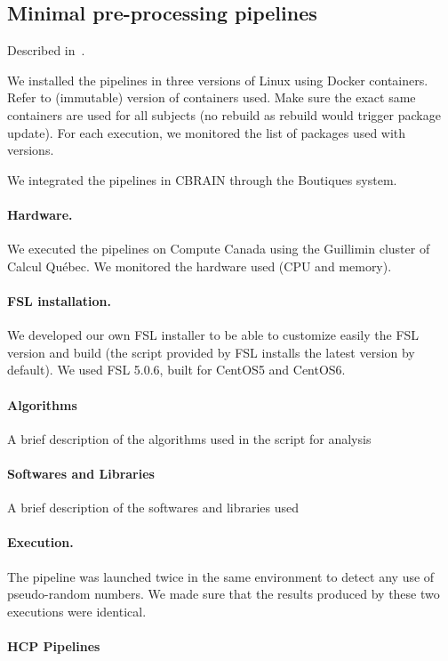 \documentclass{article}
\begin{document}
\subsection{Minimal pre-processing pipelines}

Described in~\cite{glasser2013minimal}.

We installed the pipelines in three versions of Linux using Docker
containers. Refer to (immutable) version of containers used. Make sure
the exact same containers are used for all subjects (no rebuild as
rebuild would trigger package update). For each execution, we
monitored the list of packages used with versions.

We integrated the pipelines in CBRAIN through the Boutiques system.

\paragraph{Hardware.} We executed the pipelines on Compute Canada
using the Guillimin cluster of Calcul Qu\'ebec. We monitored the
hardware used (CPU and memory). 

\paragraph{FSL installation.} We developed our own FSL installer to be
able to customize easily the FSL version and build (the script
provided by FSL installs the latest version by default). We used FSL
5.0.6, built for CentOS5 and CentOS6.

\paragraph{Algorithms}
A brief description of the algorithms used in the script for analysis

\paragraph{Softwares and Libraries}
A brief description of the softwares and libraries used

\paragraph{Execution.} The pipeline was launched twice in the same
environment to detect any use of pseudo-random numbers. We
made sure that the results produced by these two executions were
identical.

\paragraph{HCP Pipelines}
\end{document}
